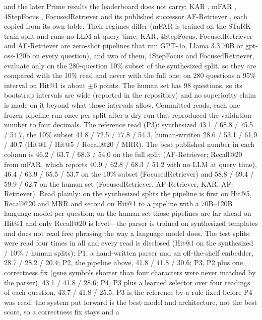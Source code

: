\documentclass[11pt,a4paper]{article}
\begin{document}
\citep{wu2024stark} and the later Prime results the leaderboard does not
carry: KAR \citep{xia2025kar}, mFAR \citep{li2025mfar}, 4StepFocus
\citep{boer2024fourstepfocus}, FocusedRetriever
\citep{boer2025focusedretriever} and its published successor
AF-Retriever \citep{boer2026afretriever}, each copied from its own
table. Their regimes differ (mFAR is trained on the STaRK train split
and runs no LLM at query time; KAR, 4StepFocus, FocusedRetriever and
AF-Retriever are zero-shot pipelines that run GPT-4o, Llama 3.3 70B or
gpt-oss-120b on every question), and two of them, 4StepFocus and
FocusedRetriever, evaluate only on the 280-question 10\% subset of the
synthesized split, so they are compared with the 10\% read and never
with the full one; on 280 questions a 95\% interval on Hit@1 is about
$\pm6$ points. The human set has 98 questions, so its bootstrap
intervals are wide (reported in the repository) and no superiority claim
is made on it beyond what those intervals allow. Committed reads, each one frozen
pipeline run once per split after a dry run that reproduced the
validation number to four decimals. The reference read (P3): synthesized
43.1 / 68.8 / 75.5 / 54.7, the 10\% subset 41.8 / 72.5 / 77.8 / 54.3,
human-written 28.6 / 53.1 / 61.9 / 40.7 (Hit@1 / Hit@5 / Recall@20 /
MRR). The best published number in each column is 46.2 / 63.7 / 68.3 /
54.0 on the full split (AF-Retriever; Recall@20 from mFAR, which reports
40.9 / 62.8 / 68.3 / 51.2 with no LLM at query time), 46.4 / 63.9 / 65.5
/ 53.7 on the 10\% subset (FocusedRetriever) and 58.8 / 69.4 / 59.9 /
62.7 on the human set (FocusedRetriever, AF-Retriever, KAR,
AF-Retriever). Read plainly: on the synthesized splits the pipeline is
first on Hit@5, Recall@20 and MRR and second on Hit@1 to a pipeline
with a 70B--120B language model per question; on the human set those
pipelines are far ahead on Hit@1 and only Recall@20 is level---the
parser is trained on synthesized templates and does not read free
phrasing the way a language model does. The test splits were
read four times in all and every read is disclosed (Hit@1 on the
synthesized / 10\% / human splits): P1, a hand-written parser and an
off-the-shelf embedder, 28.7 / 28.2 / 20.4; P2, the pipeline above,
41.8 / 41.8 / 30.6; P3, P2 plus one correctness fix (gene symbols
shorter than four characters were never matched by the parser), 43.1 /
41.8 / 28.6; P4, P3 plus a learned selector over four readings of each
question, 43.7 / 41.8 / 25.5. P3 is the reference by a rule fixed
before P4 was read: the system put forward is the best model and
architecture, not the best score, so a correctness fix stays and a
\end{document}
